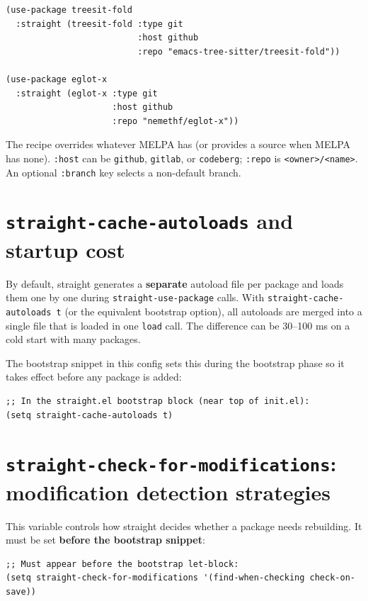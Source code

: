 \begin{verbatim}
(use-package treesit-fold
  :straight (treesit-fold :type git
                          :host github
                          :repo "emacs-tree-sitter/treesit-fold"))

(use-package eglot-x
  :straight (eglot-x :type git
                     :host github
                     :repo "nemethf/eglot-x"))
\end{verbatim}

The recipe overrides whatever MELPA has (or provides a source when MELPA has none). \texttt{:host} can be \texttt{github}, \texttt{gitlab}, or \texttt{codeberg}; \texttt{:repo} is \texttt{<owner>/<name>}. An optional \texttt{:branch} key selects a non-default branch.

\section{\texttt{straight-cache-autoloads} and startup cost}\label{straight-cache-autoloads-and-startup-cost}

By default, straight generates a \textbf{separate} autoload file per package and loads them one by one during \texttt{straight-use-package} calls. With \texttt{straight-cache-autoloads t} (or the equivalent bootstrap option), all autoloads are merged into a single file that is loaded in one \texttt{load} call. The difference can be 30--100 ms on a cold start with many packages.

The bootstrap snippet in this config sets this during the bootstrap phase so it takes effect before any package is added:

\begin{verbatim}
;; In the straight.el bootstrap block (near top of init.el):
(setq straight-cache-autoloads t)
\end{verbatim}

\section{\texttt{straight-check-for-modifications}: modification detection strategies}\label{straight-check-for-modifications-modification-detection-strategies}

This variable controls how straight decides whether a package needs rebuilding. It must be set \textbf{before the bootstrap snippet}:

\begin{verbatim}
;; Must appear before the bootstrap let-block:
(setq straight-check-for-modifications '(find-when-checking check-on-save))
\end{verbatim}

